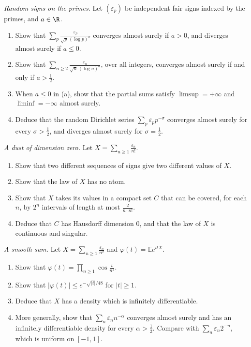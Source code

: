 \begin{exercise}[$\star$]\label{pb:primeseries}
\emph{Random signs on the primes.} Let $(\varepsilon_p)$ be independent fair signs indexed by the primes, and $a\in\R$.
\begin{enumerate}[label=(\alph*)]
\item Show that $\sum_p\frac{\varepsilon_p}{\sqrt p\,(\log p)^a}$ converges almost surely if $a>0$, and diverges almost surely if $a\le0$.
\item Show that $\sum_{n\ge2}\frac{\varepsilon_n}{\sqrt n\,(\log n)^a}$, over all integers, converges almost surely if and only if $a>\frac12$.
\item When $a\le0$ in (a), show that the partial sums satisfy $\limsup=+\infty$ and $\liminf=-\infty$ almost surely.
\item Deduce that the random Dirichlet series $\sum_p\varepsilon_pp^{-\sigma}$ converges almost surely for every $\sigma>\frac12$, and diverges almost surely for $\sigma=\frac12$.
\end{enumerate}
\end{exercise}

\begin{exercise}[$\star$]\label{pb:factorialseries}
\emph{A dust of dimension zero.} Let $X=\sum_{n\ge1}\frac{\varepsilon_n}{n!}$.
\begin{enumerate}[label=(\alph*)]
\item Show that two different sequences of signs give two different values of $X$.
\item Show that the law of $X$ has no atom.
\item Show that $X$ takes its values in a compact set $C$ that can be covered, for each $n$, by $2^n$ intervals of length at most $\frac2{n\cdot n!}$.
\item Deduce that $C$ has Hausdorff dimension $0$, and that the law of $X$ is continuous and singular.
\end{enumerate}
\end{exercise}

\begin{exercise}[$\star\star$]\label{pb:smooth}
\emph{A smooth sum.} Let $X=\sum_{n\ge1}\frac{\varepsilon_n}{n^2}$ and $\varphi(t)=\mathbb Ee^{itX}$.
\begin{enumerate}[label=(\alph*)]
\item Show that $\varphi(t)=\prod_{n\ge1}\cos\frac t{n^2}$.
\item Show that $|\varphi(t)|\le e^{-\sqrt{|t|}/48}$ for $|t|\ge1$.
\item Deduce that $X$ has a density which is infinitely differentiable.
\item More generally, show that $\sum_n\varepsilon_nn^{-\alpha}$ converges almost surely and has an infinitely differentiable density for every $\alpha>\frac12$.
Compare with $\sum_n\varepsilon_n2^{-n}$, which is uniform on $[-1,1]$.
\end{enumerate}
\end{exercise}

